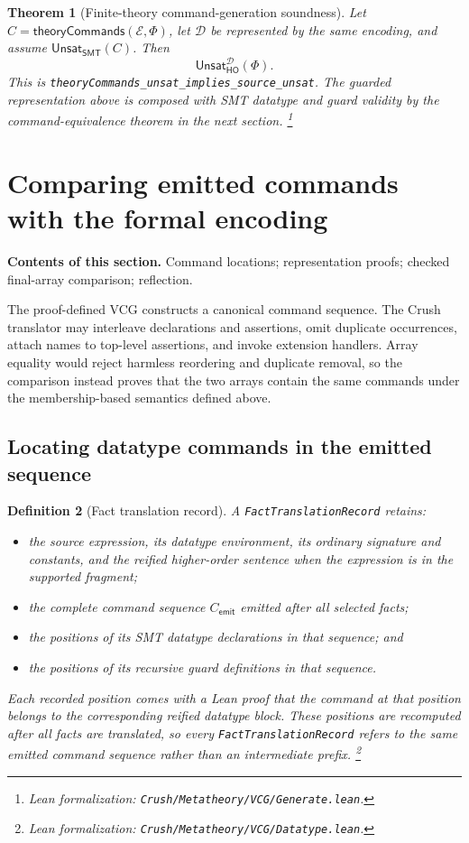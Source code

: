 \documentclass[11pt]{article}
\newtheorem{definition}{Definition}[section]
\newtheorem{theorem}[definition]{Theorem}
\theoremstyle{remark}
\newcommand{\leanfile}[1]{\footnote{Lean formalization: \texttt{Crush/Metatheory/#1}.}}
\newcommand{\sectioncontents}[1]{%
  \smallskip\noindent\textbf{Contents of this section.} #1\par\medskip}
\newcommand{\unsat}{\mathsf{Unsat}}
\begin{document}
\begin{theorem}[Finite-theory command-generation soundness]
Let $C=\mathsf{theoryCommands}(\mathcal E,\Phi)$, let $\mathcal D$ be
represented by the same encoding, and assume $\unsat_{\mathsf{SMT}}(C)$. Then
\[
 \unsat_{\mathsf{HO}}^{\mathcal D}(\Phi).
\]
This is \texttt{theoryCommands\_unsat\_implies\_source\_unsat}. The guarded
representation above is composed with SMT datatype and guard validity by
the command-equivalence theorem in the next section.
\leanfile{VCG/Generate.lean}
\end{theorem}

\section{Comparing emitted commands with the formal encoding}
\sectioncontents{Command locations; representation proofs; checked final-array comparison; reflection.}

The proof-defined VCG constructs a canonical command sequence. The Crush
translator may interleave declarations and assertions, omit duplicate
occurrences, attach names to top-level assertions, and invoke extension
handlers. Array equality would reject harmless reordering and duplicate
removal, so the comparison instead proves that the two arrays contain the same
commands under the membership-based semantics defined above.

\subsection{Locating datatype commands in the emitted sequence}

\begin{definition}[Fact translation record]
A \texttt{FactTranslationRecord} retains:
\begin{itemize}[leftmargin=*]
 \item the source expression, its datatype environment, its ordinary signature
       and constants, and the reified higher-order sentence when the expression is in the
       supported fragment;
 \item the complete command sequence $C_{\mathsf{emit}}$ emitted after all selected facts;
 \item the positions of its SMT datatype declarations in that sequence; and
 \item the positions of its recursive guard definitions in that sequence.
\end{itemize}
Each recorded position comes with a Lean proof that the command at that position
belongs to the corresponding reified datatype block. These
positions are recomputed after all facts are translated, so every
\texttt{FactTranslationRecord} refers to the same emitted command sequence rather than an
intermediate prefix.
\leanfile{VCG/Datatype.lean}
\end{definition}
\end{document}
